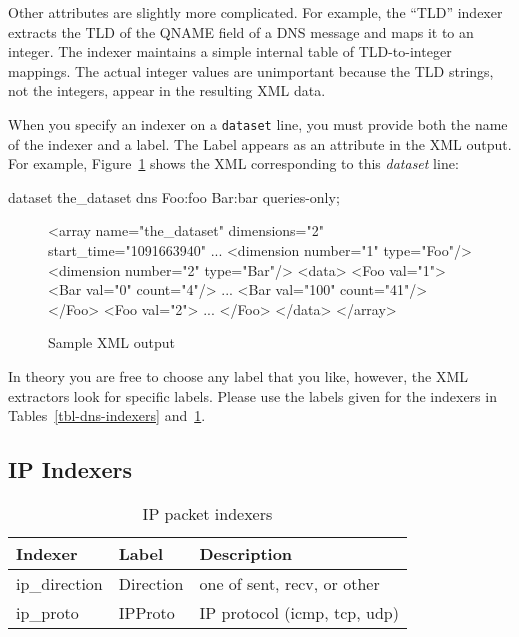 \documentclass{report}
\begin{document}
Other attributes are slightly more complicated.  For example, the
``TLD'' indexer extracts the TLD of the QNAME field of a DNS message
and maps it to an integer.  The indexer maintains a simple internal
table of TLD-to-integer mappings.  The actual integer values are
unimportant because the TLD strings, not the integers, appear in
the resulting XML data.

When you specify an indexer on a {\tt dataset\/} line, you must
provide both the name of the indexer and a label.  The Label appears
as an attribute in the XML output.  For example,
Figure~\ref{fig-sample-xml} shows the XML corresponding to this
{\em dataset\/} line:

\begin{MyVerbatim}
dataset the_dataset dns Foo:foo Bar:bar queries-only;
\end{MyVerbatim}

\begin{figure}
\begin{MyVerbatim}
<array name="the_dataset" dimensions="2" start_time="1091663940" ...
  <dimension number="1" type="Foo"/>
  <dimension number="2" type="Bar"/>
  <data>
    <Foo val="1">
      <Bar val="0" count="4"/>
      ...
      <Bar val="100" count="41"/>
    </Foo>
    <Foo val="2">
      ...
    </Foo>
  </data>
</array>
\end{MyVerbatim}
\caption{\label{fig-sample-xml}Sample XML output}
\end{figure}

In theory you are free to choose any label that you like, however,
the XML extractors look for specific labels.  Please use the labels
given for the indexers in Tables~\ref{tbl-dns-indexers}
and~\ref{tbl-ip-indexers}.

\subsection{IP Indexers}

\begin{table}
\begin{center}
\begin{tabular}{|lll|}
\hline
Indexer & Label & Description \\
\hline 
ip\_direction & Direction & one of sent, recv, or other \\
ip\_proto & IPProto & IP protocol (icmp, tcp, udp) \\
\hline
\end{tabular}
\caption{\label{tbl-ip-indexers}IP packet indexers}
\end{center}
\end{table}
\end{document}
